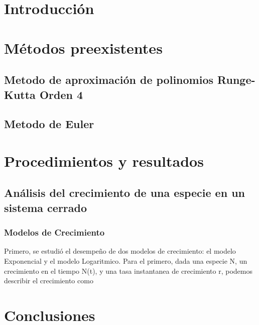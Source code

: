\documentclass[12pt]{article} %
\begin{document}
\begin{multicols}{2}
\raggedcolumns

\section{Introducción}

\section{Métodos preexistentes}

\subsection*{Metodo de aproximación de polinomios Runge-Kutta Orden 4}

\subsection*{Metodo de Euler}

\section{Procedimientos y resultados}

\subsection{Análisis del crecimiento de una especie en un sistema cerrado}\label{sec:1}
\subsubsection{Modelos de Crecimiento}\label{ssec:1a}

Primero, se estudió el desempeño de dos modelos de crecimiento: el modelo Exponencial y el modelo Logaritmico. Para el primero, dada una especie N, un crecimiento en el tiempo N(t), 
y una tasa instantanea de crecimiento r, podemos describir el crecimiento como 


\section{Conclusiones}

\begin{thebibliography}{99} %

\end{thebibliography}

\end{multicols}
\end{document}
